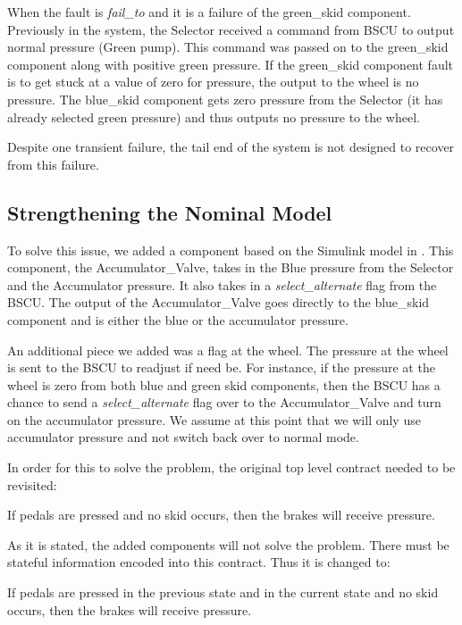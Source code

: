 When the fault is \textit{fail\_to} and it is a failure of the green\_skid component. Previously in the system, the Selector received a command from BSCU to output normal pressure (Green pump). This command was passed on to the green\_skid component along with positive green pressure. If the green\_skid component fault is to get stuck at a value of zero for pressure, the output to the wheel is no pressure. The blue\_skid component gets zero pressure from the Selector (it has already selected green pressure) and thus outputs no pressure to the wheel. 

Despite one transient failure, the tail end of the system is not designed to recover from this failure. 

\subsection{Strengthening the Nominal Model}

To solve this issue, we added a component based on the Simulink model in \cite{Joshi05:Dasc}. This component, the Accumulator\_Valve, takes in the Blue pressure from the Selector and the Accumulator pressure. It also takes in a \textit{select\_alternate} flag from the BSCU. The output of the Accumulator\_Valve goes directly to the blue\_skid component and is either the blue or the accumulator pressure. 

An additional piece we added was a flag at the wheel. The pressure at the wheel is sent to the BSCU to readjust if need be. For instance, if the pressure at the wheel is zero from both blue and green skid components, then the BSCU has a chance to send a \textit{select\_alternate} flag over to the Accumulator\_Valve and turn on the accumulator pressure. We assume at this point that we will only use accumulator pressure and not switch back over to normal mode. 

In order for this to solve the problem, the original top level contract needed to be revisited: 

\begin{tt}
If pedals are pressed and no skid occurs, then the brakes will receive pressure. 
\end{tt}

As it is stated, the added components will not solve the problem. There must be stateful information encoded into this contract. Thus it is changed to: 

\begin{tt}
If pedals are pressed in the previous state and in the current state and no skid occurs, then the brakes will receive pressure. 
\end{tt}
















